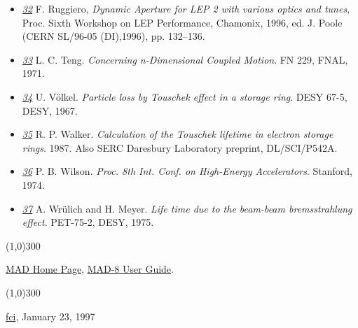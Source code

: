 \begin{itemize}
	\item \href{chamonix96}{\textit{32}} F. Ruggiero, \textit{Dynamic Aperture for LEP 2 with various optics and tunes}, Proc. Sixth Workshop on LEP Performance, Chamonix, 1996, ed. J. Poole (CERN SL/96-05 (DI),1996), pp. 132--136. 


	\item \href{teng}{\textit{33}} L. C. Teng. \textit{Concerning n-Dimensional Coupled Motion}. FN 229, FNAL, 1971. 


	\item \href{voelkel}{\textit{34}} U. V\"olkel. \textit{Particle loss by Touschek effect in a storage ring}. DESY 67-5, DESY, 1967. 


	\item \href{walker}{\textit{35}} R. P. Walker. \textit{Calculation of the Touschek lifetime in electron storage rings}. 1987. Also SERC Daresbury Laboratory preprint, DL/SCI/P542A. 


	\item \href{wilson}{\textit{36}} P. B. Wilson. \textit{Proc. 8th Int. Conf. on High-Energy Accelerators}. Stanford, 1974. 


	\item \href{wrulich}{\textit{37}} A. Wr\"ulich and H. Meyer. \textit{Life time due to the beam-beam bremsstrahlung effect}. PET-75-2, DESY, 1975. %
\end{itemize}

\line(1,0){300}

\href{http://cern.ch/mad}{MAD Home Page}, \href{http://cern.ch/mad8/user/mad.html}{MAD-8 User Guide}. 

\line(1,0){300}

\href{http://wwwslap.cern.ch/fci/fci_sign.html}{fci}, January 23, 1997 


